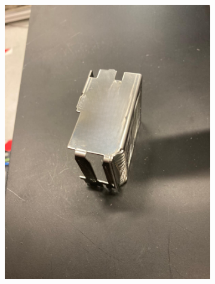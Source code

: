\begin{figure}[h]
    \centering
    \begin{subfigure}{0.48\textwidth}
        \centering
        \includegraphics[width=\textwidth]{figures/bending/final-part02.png}
        \caption{}
        \label{subfig:final-part1}
        \vspace{0.5cm}
    \end{subfigure}\hspace{0.25cm}
    \begin{subfigure}{0.48\textwidth}
        \centering

\end{subfigure}
\end{figure}
